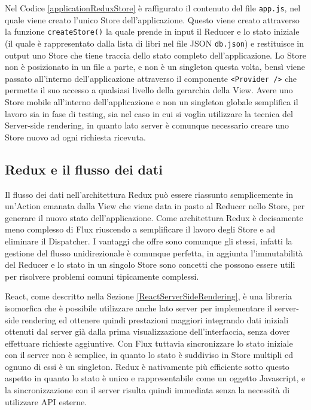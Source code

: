 Nel Codice \ref{applicationReduxStore} è raffigurato il contenuto del file \texttt{app.js}, nel quale viene creato l'unico Store dell'applicazione. Questo viene creato attraverso
la funzione \texttt{createStore()} la quale prende in input il Reducer e lo stato iniziale (il quale è rappresentato dalla lista di libri nel file JSON \texttt{db.json}) e restituisce in output uno Store che tiene traccia dello stato completo dell'applicazione.
Lo Store non è posizionato in un file a parte, e non è un singleton questa volta, bensì viene passato all'interno dell'applicazione attraverso il componente \texttt{<Provider />} che permette il suo accesso a qualsiasi livello della gerarchia della View.
Avere uno Store mobile all'interno dell'applicazione e non un singleton globale semplifica il lavoro sia in fase di testing, sia nel caso in cui si voglia utilizzare la tecnica del Server-side rendering, in quanto lato server è comunque necessario creare uno Store nuovo ad ogni richiesta ricevuta.

\subsection{Redux e il flusso dei dati}
Il flusso dei dati nell'architettura Redux può essere riassunto semplicemente in un'Action emanata dalla View che viene data in pasto al Reducer nello Store, per generare il nuovo stato dell'applicazione.
Come architettura Redux è decisamente meno complesso di Flux riuscendo a semplificare il lavoro degli Store e ad eliminare il Dispatcher. I vantaggi che offre sono comunque gli stessi, infatti la gestione del flusso unidirezionale è comunque perfetta, in aggiunta l'immutabilità del Reducer e lo stato in un singolo Store sono concetti che possono essere utili per risolvere problemi comuni tipicamente complessi.

React, come descritto nella Sezione \ref{ReactServerSideRendering}, è una libreria isomorfica che è possibile utilizzare anche lato server per implementare il server-side rendering ed ottenere quindi prestazioni maggiori integrando dati iniziali ottenuti dal server già dalla prima visualizzazione dell'interfaccia, senza dover effettuare richieste aggiuntive. Con Flux tuttavia sincronizzare lo stato iniziale con il server non è semplice, in quanto lo stato è suddiviso in Store multipli ed ognuno di essi è un singleton. Redux è nativamente più efficiente sotto questo aspetto in quanto lo stato è unico e rappresentabile come un oggetto Javascript, e la sincronizzazione con il server risulta quindi immediata senza la necessità di utilizzare API esterne.

